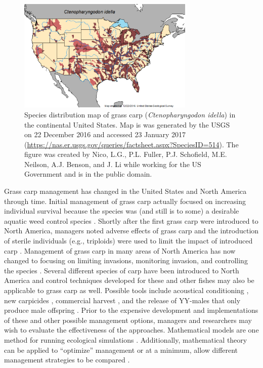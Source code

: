 \documentclass{article}[12pt]
\begin{document}
\begin{figure}[htbp]
   \centering  
   \includegraphics[width=0.75\textwidth]{carpMap.pdf} %
   \caption{Species distribution map of grass carp (\textit{Ctenopharyngodon idella}) in the continental United States. Map is was generated by the USGS on 22 December 2016 and accessed 23 January 2017 (\protect\url{https://nas.er.usgs.gov/queries/factsheet.aspx?SpeciesID=514}). The figure was created by Nico, L.G., P.L. Fuller, P.J. Schofield, M.E. Neilson, A.J. Benson, and J. Li while working for the US Government and is in the public domain.}
   \label{fig:carpMap}
\end{figure}

Grass carp management has changed in the United States and North America through time. 
Initial management of grass carp actually focused on increasing individual survival because the species was (and still is to some) a desirable aquatic weed control species \citep[e.g.,][]{cross1969aquatic, mitzner1978evaluation, kilambi1979effects, rottmann1991comparison}.
Shortly after the first grass carp were introduced to North America, managers noted adverse effects of grass carp and the introduction of sterile individuals (e.g., triploids) were used to limit the impact of introduced carp \citep{chilton1992biology}.  
Management of grass carp  in many areas of North America has now changed to focusing on limiting invasions, monitoring invasion, and controlling the species \citep{chapman2013first, wittmann2014grass}. 
Several different species of carp have been introduced to North America and control techniques developed for these and other fishes may also be applicable to grass carp as well.
Possible tools include acoustical conditioning \citep{sloan2013acoustical},
new carpicides \citep{putnam2017using},
commercial harvest \citep{colvin2012strategies},
and the release of YY-males that only produce male offspring \citep{schill2016production}.
Prior to the expensive development and implementations of these and other possible management options, managers and researchers may wish to evaluate the effectiveness of the approaches. 
Mathematical models are one method for running ecological simulations \citep{bolker2008ecological}.
Additionally, mathematical theory can be applied to ``optimize'' management \citep{lenhart2007optimal} or at a minimum, allow different management strategies to be compared \citep{caswell_matrix_2001, morris2002quantitative}.
\end{document}
